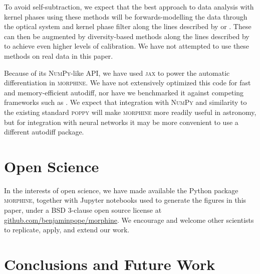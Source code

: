 \documentclass[modern]{aastex63}
\begin{document}
To avoid self-subtraction, we expect that the best approach to data analysis with kernel phases using these methods will be forwards-modelling the data through the optical system and kernel phase filter along the lines described by \citet{pueyo16} or \citet{martinache20}. These can then be augmented by diversity-based methods along the lines described by \citet{ireland13} to achieve even higher levels of calibration. We have not attempted to use these methods on real data in this paper.


Because of its \textsc{NumPy}-like API, we have used \textsc{jax} to power the automatic differentiation in \textsc{morphine}. We have not extensively optimized this code for fast and memory-efficient autodiff, nor have we benchmarked it against competing frameworks such as . We expect that integration with \textsc{NumPy} and similarity to the existing standard \textsc{poppy} will make \textsc{morphine} more readily useful in astronomy, but for integration with neural networks it may be more convenient to use a different autodiff package. 

\section{Open Science}
\label{sec:open}

In the interests of open science, we have made available the Python package \textsc{morphine}, together with Jupyter notebooks used to generate the figures in this paper, under a BSD 3-clause open source license at \href{https://github.com/benjaminpope/morphine}{github.com/benjaminpope/morphine}. We encourage and welcome other scientists to replicate, apply, and extend our work.

\section{Conclusions and Future Work}
\label{sec:conclusions}
\end{document}
